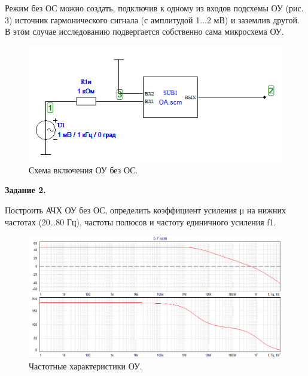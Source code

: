 \documentclass[a4paper,14pt]{extarticle}
\begin{document}
    Режим без ОС можно создать, подключив к одному из входов подсхемы ОУ 
    (рис. 3) источник гармонического сигнала (с амплитудой 1...2 мВ) и 
    заземлив другой. В этом случае исследованию подвергается 
    собственно сама микросхема ОУ.

    \begin{figure}[h!]
        \begin{center}
            \includegraphics{4.png}
        \end{center}
        \caption{Схема включения ОУ без ОС.}
    \end{figure}
    
    \begin{center}
        \textbf{Задание 2.}
    \end{center}

    Построить АЧХ ОУ без ОС, определить коэффициент усиления μ на нижних 
    частотах (20…80 Гц), частоты полюсов и частоту единичного усиления f1.

    \begin{figure}[h!]
        \begin{center}
            \includegraphics[scale=0.6]{5.png}
        \end{center}
        \caption{Частотные характеристики ОУ.}
    \end{figure}
\end{document}

